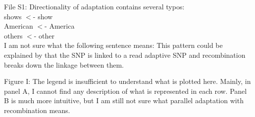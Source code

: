 \documentclass[onecolumn,oneside,letterpaper]{article}
\begin{document}
File S1: Directionality of adaptation contains several typos: \\
shows $<$- show \\
American $<$- America \\
others $<$- other \\
I am not sure what the following sentence means: This pattern could be explained by that the SNP is linked to a read adaptive SNP and recombination breaks down the linkage between them.  

Figure I: The legend is insufficient to understand what is plotted here. Mainly, in panel A, I cannot find any description of what is represented in each row. Panel B is much more intuitive, but I am still not sure what parallel adaptation with recombination means.  

\end{document}
